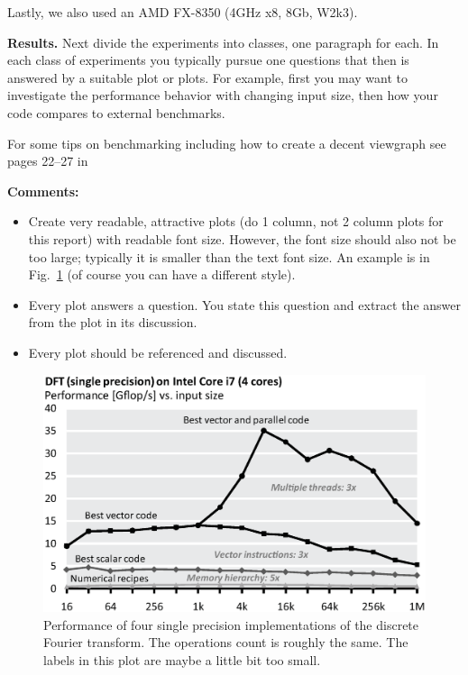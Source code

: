 \documentclass[letterpaper]{article}
\newcommand{\mypar}[1]{{\bf #1.}} %
\begin{document}
	Lastly, we also used an AMD FX-8350 (4GHz x8, 8Gb, W2k3).
	
	\mypar{Results}
	Next divide the experiments into classes, one paragraph for each. In each class of experiments you typically pursue one questions that then is answered by a suitable plot or plots. For example, first you may want to investigate the performance behavior with changing input size, then how your code compares to external benchmarks.
	
	For some tips on benchmarking including how to create a decent viewgraph see pages 22--27 in
	
	
	
	{\bf Comments:}
	\begin{itemize}
	\item Create very readable, attractive plots (do 1 column, not 2 column plots
	for this report) with readable font size. However, the font size should also not be too large; typically it is smaller than the text font size.
	An example is in Fig.~\ref{fftperf} (of course you can have a different style).
	\item Every plot answers a question. You state this question and extract the
	answer from the plot in its discussion.
	\item Every plot should be referenced and discussed.
	\end{itemize}
	
	\begin{figure}\centering
	  \includegraphics[scale=0.33]{dft-performance.eps}
	  \caption{Performance of four single precision implementations of the
	  discrete Fourier transform. The operations count is roughly the
	  same. The labels in this plot are maybe a little bit too small.\label{fftperf}}
	\end{figure}
	
\end{document}
